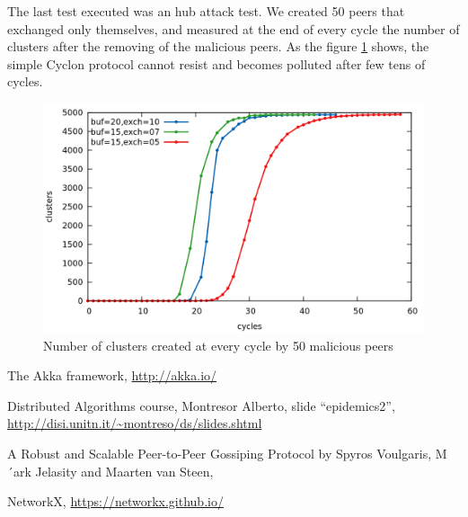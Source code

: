 \documentclass[a4paper,12pt,notitlepage]{article} %
\begin{document}
The last test executed was an hub attack test. We created 50 peers that exchanged only themselves, and measured
 at the end of every cycle the number of clusters after the removing of the malicious peers. As the 
 figure \ref{attack} shows, the simple Cyclon protocol cannot resist and becomes polluted after few tens of cycles.

\begin{figure} [H]
	\centering
	\includegraphics[width=1\textwidth]{img/attack}
	\caption{Number of clusters created at every cycle by 50 malicious peers}
	\label{attack}
\end{figure}


\begin{thebibliography}{9}

  The Akka framework,
  \url{http://akka.io/}

  Distributed Algorithms course,
  Montresor Alberto,
  slide ``epidemics2'',
  \url{http://disi.unitn.it/~montreso/ds/slides.shtml}


  A Robust and Scalable Peer-to-Peer Gossiping Protocol by
  Spyros Voulgaris, M´ark Jelasity and Maarten van Steen,

  NetworkX,
  \url{https://networkx.github.io/}



\end{thebibliography}
\end{document}
